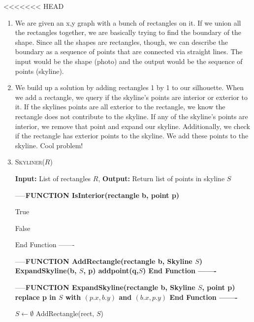 \documentclass{article}
\begin{document}
<<<<<<< HEAD
\begin{enumerate}
	\item We are given an x,y graph with a bunch of rectangles on it. If we union all the rectangles together, we are basically trying to find the boundary of the shape. Since all the shapes are rectangles, though, we can describe the boundary as a sequence of points that are connected via straight lines. The input would be the shape (photo) and the output would be the sequence of points (skyline). 
	\item We build up a solution by adding rectangles 1 by 1 to our silhouette. When we add a rectangle, we query if the skyline's points are interior or exterior to it. If the skylines points are all exterior to the rectangle, we know the rectangle does not contribute to the skyline. If any of the skyline's points are interior, we remove that point and expand our skyline. Additionally, we check if the rectangle has exterior points to the skyline. We add these points to the skyline.  Cool problem!
	\item 
\begin{algorithm}\caption{\textsc{Skyliner}($R$)}\label{alg:bs}
                        {\bf Input:} List of rectangles $R$,
                        {\bf Output:} Return list of points in skyline $S$ 
                \begin{algorithmic}[h]
			\State -----\bf{FUNCTION IsInterior(rectangle b, point p)}

		
			\State \Return True
			\EndIf
			
		
		\Else
			\State \Return False
		\EndIf

		\State End Function
			\State -------


		\State -----\bf{FUNCTION AddRectangle(rectangle b, Skyline $S$)}
			\State ExpandSkyline(b, $S$, p)
			\EndIf
			\EndFor
			\State addpoint(q,$S$)
			\EndIf
			\EndFor
	\State End Function
	\State -------

		\State -----\bf{FUNCTION ExpandSkyline(rectangle b, Skyline $S$, point p)}
			\State replace p in $S$ with $(p.x, b.y)$ and $(b.x, p.y)$
\State End Function
	\State -------




		\State $S \gets \emptyset$ 
			\State AddRectangle(rect, $S$)
			\EndFor





\end{algorithmic}
\end{algorithm}
\end{enumerate}
\end{document}
